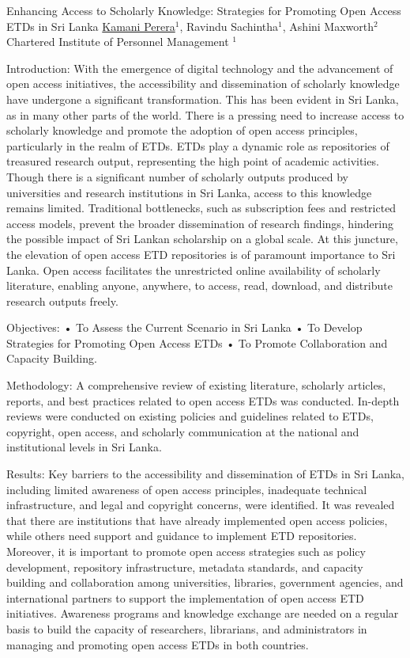 \begin{abstract_online}{Enhancing Access to Scholarly Knowledge: Strategies for Promoting Open Access ETDs in Sri Lanka}{%
        \underline{Kamani Perera}$^{1}$, Ravindu Sachintha$^{1}$, Ashini Maxworth$^{2}$}{%
        Chartered Institute of Personnel Management}{%
        $^1$ }

    Introduction: With the emergence of digital technology and the advancement of open access initiatives, the accessibility and dissemination of scholarly knowledge have undergone a significant transformation. This has been evident in Sri Lanka, as in many other parts of the world. There is a pressing need to increase access to scholarly knowledge and promote the adoption of open access principles, particularly in the realm of ETDs. ETDs play a dynamic role as repositories of treasured research output, representing the high point of academic activities. Though there is a significant number of scholarly outputs produced by universities and research institutions in Sri Lanka, access to this knowledge remains limited. Traditional bottlenecks, such as subscription fees and restricted access models, prevent the broader dissemination of research findings, hindering the possible impact of Sri Lankan scholarship on a global scale. At this juncture, the elevation of open access ETD repositories is of paramount importance to Sri Lanka. Open access facilitates the unrestricted online availability of scholarly literature, enabling anyone, anywhere, to access, read, download, and distribute research outputs freely. 

    Objectives: • To Assess the Current Scenario in Sri Lanka • To Develop Strategies for Promoting Open Access ETDs • To Promote Collaboration and Capacity Building.
       
    Methodology: A comprehensive review of existing literature, scholarly articles, reports, and best practices related to open access ETDs was conducted. In-depth reviews were conducted on existing policies and guidelines related to ETDs, copyright, open access, and scholarly communication at the national and institutional levels in Sri Lanka. 

    Results: Key barriers to the accessibility and dissemination of ETDs in Sri Lanka, including limited awareness of open access principles, inadequate technical infrastructure, and legal and copyright concerns, were identified. It was revealed that there are institutions that have already implemented open access policies, while others need support and guidance to implement ETD repositories. Moreover, it is important to promote open access strategies such as policy development, repository infrastructure, metadata standards, and capacity building and collaboration among universities, libraries, government agencies, and international partners to support the implementation of open access ETD initiatives. Awareness programs and knowledge exchange are needed on a regular basis to build the capacity of researchers, librarians, and administrators in managing and promoting open access ETDs in both countries.
      

\end{abstract_online}

